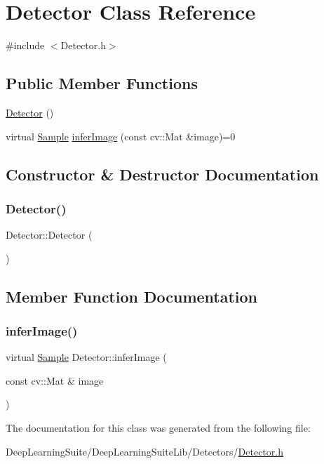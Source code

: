 \hypertarget{class_detector}{}\section{Detector Class Reference}
\label{class_detector}


{\ttfamily \#include $<$Detector.\+h$>$}

\subsection*{Public Member Functions}
\begin{DoxyCompactItemize}
\item 
\hyperlink{class_detector_aa43b3d7bbd4b225855b4bcc93f70b225}{Detector} ()
\item 
virtual \hyperlink{struct_sample}{Sample} \hyperlink{class_detector_a2f86c9bdc9cacd3bbc4d62d9a142c455}{infer\+Image} (const cv\+::\+Mat \&image)=0
\end{DoxyCompactItemize}


\subsection{Constructor \& Destructor Documentation}
\mbox{\label{class_detector_aa43b3d7bbd4b225855b4bcc93f70b225}} 
\subsubsection{\texorpdfstring{Detector()}{Detector()}}
{\footnotesize\ttfamily Detector\+::\+Detector (\begin{DoxyParamCaption}{ }\end{DoxyParamCaption})\hspace{0.3cm}{\ttfamily [inline]}}



\subsection{Member Function Documentation}
\mbox{\label{class_detector_a2f86c9bdc9cacd3bbc4d62d9a142c455}} 
\subsubsection{\texorpdfstring{infer\+Image()}{inferImage()}}
{\footnotesize\ttfamily virtual \hyperlink{struct_sample}{Sample} Detector\+::infer\+Image (\begin{DoxyParamCaption}\item[{const cv\+::\+Mat \&}]{image }\end{DoxyParamCaption})\hspace{0.3cm}{\ttfamily [pure virtual]}}



The documentation for this class was generated from the following file\+:\begin{DoxyCompactItemize}
\item 
Deep\+Learning\+Suite/\+Deep\+Learning\+Suite\+Lib/\+Detectors/\hyperlink{_deep_learning_suite_lib_2_detectors_2_detector_8h}{Detector.\+h}\end{DoxyCompactItemize}
